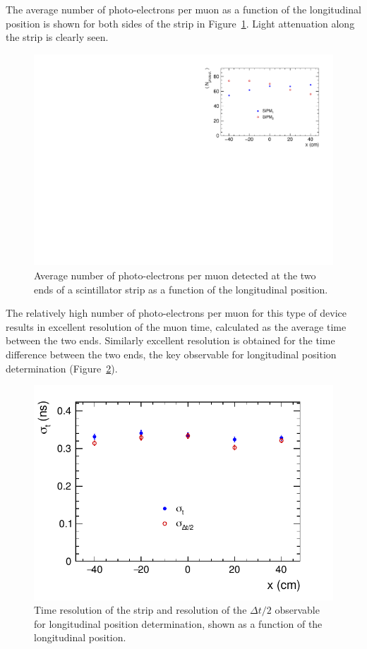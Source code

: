 The average number of photo-electrons per muon as a function of the longitudinal position is shown for both sides of the strip in Figure~\ref{fig:nphot}. Light attenuation along the strip is clearly seen.

\begin{figure}[h!]
\centering
   \includegraphics[width=.6\textwidth]{MuonDetector/Scintillator/nphot}
   \caption{\label{fig:nphot} Average number of photo-electrons per muon detected at the two ends of a scintillator strip as a function of the longitudinal position.}
\end{figure}

The relatively high number of photo-electrons per muon for this type of device results in excellent resolution of the muon time, calculated as the average time between the two ends. Similarly excellent resolution is obtained for the time difference between the two ends, the key observable for longitudinal position determination (Figure~\ref{fig:sigma-tdt}).

\begin{figure}[h!]
\centering
   \includegraphics[width=.6\textwidth]{MuonDetector/Scintillator/sigma-tdt}
   \caption{\label{fig:sigma-tdt} Time resolution of the strip and resolution of the $\Delta t/2$ observable for longitudinal position determination, shown as a function of the longitudinal position.}
\end{figure}

